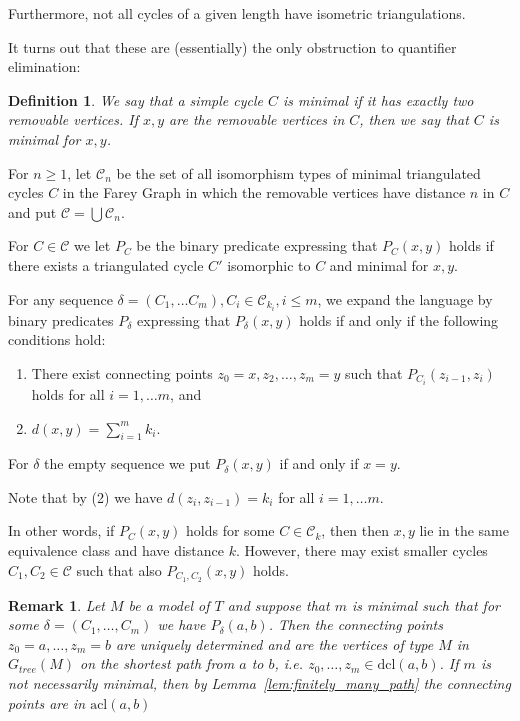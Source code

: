 \documentclass{amsart}
\renewcommand{\d}{\delta}
\newcommand{\C}{\mathcal{C}}
\newcommand{\acl}{\mathrm{acl}}
\newcommand{\dcl}{\mathrm{dcl}}
\newtheorem{definition}[defi]{Definition}
\newtheorem{remark}[defi]{Remark}
\begin{document}
Furthermore, not all cycles of a given length have isometric triangulations.

It turns out that these are (essentially) the only obstruction to quantifier elimination:






\begin{definition}\label{def:min cycle} We say that a simple cycle $C$ is minimal if it has exactly two removable vertices. If $x,y$ are the removable vertices in $C$, then we say that $C$ is minimal for $x,y$.
\end{definition}




For $n\geq 1$, let $\C_n$ be the set of all  isomorphism types of minimal triangulated cycles $C$ in the Farey
Graph in which the removable vertices have distance $n$ in $C$ and
put $\C=\bigcup\C_n$.


For $C\in\C$ we let $P_C$ be the binary predicate expressing that $P_C(x, y)$ holds
if there exists a  triangulated cycle $C'$  isomorphic to $C$ and minimal for $x,y$.


For any sequence $\delta = (C_1, \dots C_m), C_i\in\C_{k_i}, i\leq m$,
we expand the language by binary predicates $P_\delta$ expressing that $P_\delta(x,y)$ holds if and only
if the following conditions hold:

\begin{enumerate}
    \item There exist connecting points $z_0=x,z_2, \dots, z_m=y$  such that
     $ P_{C_i}(z_{i-1}, z_i)$ holds for all $i=1,\ldots m$, and
    \item $d(x,y)=\sum_{i=1}^m k_i$.
\end{enumerate}

For $\delta$ the empty sequence we put $P_\d(x,y)$ if and only if $x=y$.

Note that by (2) we have $d(z_i,z_{i-1})=k_i$  for all $i=1,\ldots m$.

In other words, if $P_C(x,y)$ holds for some $C\in\C_k$, then  then $x,y$ lie in the same equivalence class and have distance $k$. However, there may exist smaller cycles $C_1,C_2\in \C$ such that also $P_{C_1,C_2}(x,y)$  holds. 

\begin{remark}\label{rem:unique connecting points}
Let $M$ be a model of $T$ and suppose that $m$ is minimal such that for some $\delta=(C_1,\ldots, C_m)$ we have $P_\d(a,b)$. Then the connecting points $z_0=a,\ldots, z_m=b$ are uniquely determined and are the vertices of type $M$ in $G_{tree}(M)$ on the shortest path from $a$  to $b$, i.e. $z_0,\ldots, z_m\in\dcl(a,b)$.
If $m$ is not necessarily minimal, then by Lemma~\ref{lem:finitely_many_path} the connecting points are in $\acl(a,b)$
\end{remark}
\end{document}

